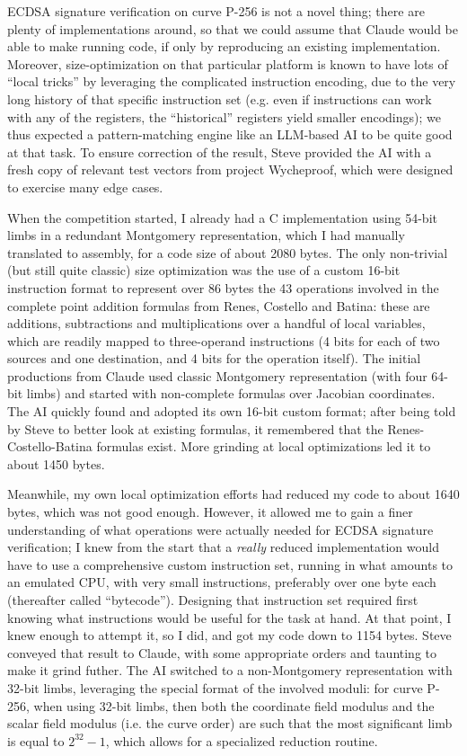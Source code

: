 \documentclass{llncs}
\begin{document}
ECDSA signature verification on curve P-256 is not a novel thing; there
are plenty of implementations around, so that we could assume that
Claude would be able to make running code, if only by reproducing an
existing implementation. Moreover, size-optimization on that particular
platform is known to have lots of ``local tricks'' by leveraging the
complicated instruction encoding, due to the very long history of that
specific instruction set (e.g. even if instructions can work with any of
the registers, the ``historical'' registers yield smaller encodings); we
thus expected a pattern-matching engine like an LLM-based AI to be quite
good at that task. To ensure correction of the result, Steve provided
the AI with a fresh copy of relevant test vectors from project
Wycheproof\cite{Wycheproof}, which were designed to exercise many edge
cases.

When the competition started, I already had a C implementation using
54-bit limbs in a redundant Montgomery representation, which I had
manually translated to assembly, for a code size of about 2080 bytes.
The only non-trivial (but still quite classic) size optimization was the
use of a custom 16-bit instruction format to represent over 86 bytes the
43 operations involved in the complete point addition formulas from
Renes, Costello and Batina\cite{RenCosBat2016}: these are additions,
subtractions and multiplications over a handful of local variables,
which are readily mapped to three-operand instructions (4 bits for each
of two sources and one destination, and 4 bits for the operation
itself). The initial productions from Claude used classic Montgomery
representation (with four 64-bit limbs) and started with non-complete
formulas over Jacobian coordinates. The AI quickly found and adopted its
own 16-bit custom format; after being told by Steve to better look at
existing formulas, it remembered that the Renes-Costello-Batina formulas
exist. More grinding at local optimizations led it to about 1450 bytes.

Meanwhile, my own local optimization efforts had reduced my code to
about 1640 bytes, which was not good enough. However, it allowed me to
gain a finer understanding of what operations were actually needed for
ECDSA signature verification; I knew from the start that a \emph{really}
reduced implementation would have to use a comprehensive custom
instruction set, running in what amounts to an emulated CPU, with very
small instructions, preferably over one byte each (thereafter called
``bytecode''). Designing that instruction set required first knowing
what instructions would be useful for the task at hand. At that point, I
knew enough to attempt it, so I did, and got my code down to 1154 bytes.
Steve conveyed that result to Claude, with some appropriate orders and
taunting to make it grind futher. The AI switched to a non-Montgomery
representation with 32-bit limbs, leveraging the special format of the
involved moduli: for curve P-256, when using 32-bit limbs, then both the
coordinate field modulus and the scalar field modulus (i.e. the curve
order) are such that the most significant limb is equal to $2^{32}-1$,
which allows for a specialized reduction routine.
\end{document}
